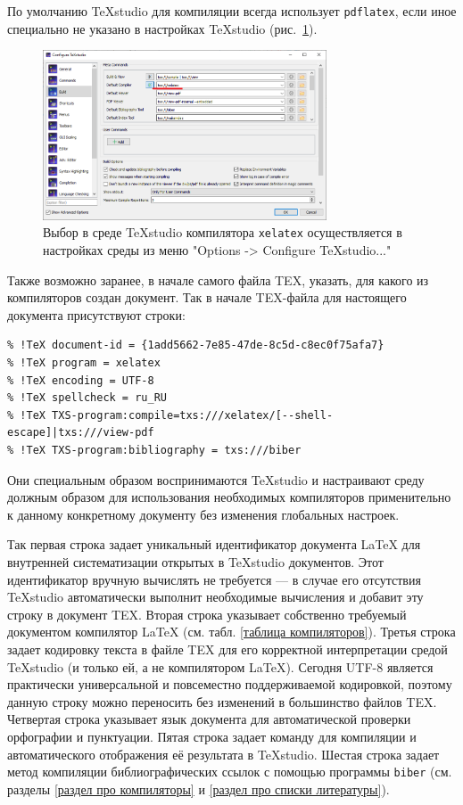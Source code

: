 \documentclass[workbook, draught]{fefudoc}
\begin{document}
По умолчанию TeXstudio для компиляции всегда использует \texttt{pdflatex}, если иное специально не указано в настройках TeXstudio (рис.~\ref{texstudio-options}).
\begin{figure}[ht]
\centering
\includegraphics[width=0.75\textwidth]{workbook-extras/texstudio-options}
\caption{Выбор в среде TeXstudio компилятора \texttt{xelatex} осуществляется в настройках среды из меню "Options -> Configure TeXstudio..."}
\label{texstudio-options}
\end{figure}

Также возможно заранее, в начале самого файла TEX, указать, для какого из компиляторов создан документ.
Так в начале TEX-файла для настоящего документа присутствуют строки:
\begin{verbatim}
% !TeX document-id = {1add5662-7e85-47de-8c5d-c8ec0f75afa7}
% !TeX program = xelatex
% !TeX encoding = UTF-8
% !TeX spellcheck = ru_RU
% !TeX TXS-program:compile=txs:///xelatex/[--shell-escape]|txs:///view-pdf
% !TeX TXS-program:bibliography = txs:///biber
\end{verbatim}

Они специальным образом воспринимаются TeXstudio и настраивают среду должным образом для использования необходимых компиляторов применительно к данному конкретному документу без изменения глобальных настроек.

Так первая строка задает уникальный идентификатор документа \LaTeX{} для внутренней систематизации открытых в TeXstudio документов.
Этот идентификатор вручную вычислять не требуется --- в случае его отсутствия TeXstudio автоматически выполнит необходимые вычисления и добавит эту строку в документ TEX.
Вторая строка указывает собственно требуемый документом компилятор \LaTeX{} (см. табл. \ref{таблица компиляторов}).
Третья строка задает кодировку текста в файле TEX для его корректной интерпретации средой TeXstudio (и только ей, а не компилятором \LaTeX{}).
Сегодня UTF-8 является практически универсальной и повсеместно поддерживаемой кодировкой, поэтому данную строку можно переносить без изменений в большинство файлов TEX.
Четвертая строка указывает язык документа для автоматической проверки орфографии и пунктуации.
Пятая строка задает команду для компиляции и автоматического отображения её результата в TeXstudio.
Шестая строка задает метод компиляции библиографических ссылок с помощью программы \texttt{biber} (см. разделы \ref{раздел про компиляторы} и \ref{раздел про списки литературы}).
\end{document}
